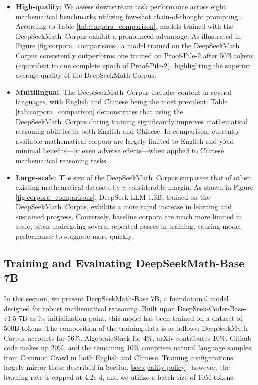 \begin{itemize}[topsep=0pt]
    \item \textbf{High-quality}:
    We assess downstream task performance across eight mathematical benchmarks utilizing few-shot chain-of-thought prompting \cite{cot}. According to Table \ref{tab:corpora_comparison}, models trained with the DeepSeekMath~Corpus exhibit a pronounced advantage. As illustrated in Figure \ref{fig:corpora_comparisons}, a model trained on the DeepSeekMath Corpus consistently outperforms one trained on Proof-Pile-2 after 50B tokens (equivalent to one complete epoch of Proof-Pile-2), highlighting the superior average quality of the DeepSeekMath Corpus.
    \item \textbf{Multilingual}:
    The DeepSeekMath~Corpus includes content in several languages, with English and Chinese being the most prevalent. Table \ref{tab:corpora_comparison} demonstrates that using the DeepSeekMath~Corpus during training significantly improves mathematical reasoning abilities in both English and Chinese. In comparison, currently available mathematical corpora are largely limited to English and yield minimal benefits—or even adverse effects—when applied to Chinese mathematical reasoning tasks.
    \item \textbf{Large-scale}:
    The size of the DeepSeekMath~Corpus surpasses that of other existing mathematical datasets by a considerable margin. As shown in Figure \ref{fig:corpora_comparisons}, DeepSeek-LLM 1.3B, trained on the DeepSeekMath~Corpus, exhibits a more rapid increase in learning and sustained progress. Conversely, baseline corpora are much more limited in scale, often undergoing several repeated passes in training, causing model performance to stagnate more quickly.
\end{itemize}

\subsection{Training and Evaluating DeepSeekMath-Base 7B}

In this section, we present DeepSeekMath-Base 7B, a foundational model designed for robust mathematical reasoning. Built upon DeepSeek-Coder-Base-v1.5 7B \citep{deepseek-coder} as its initialization point, this model has been trained on a dataset of 500B tokens. The composition of the training data is as follows: DeepSeekMath Corpus accounts for 56\%, AlgebraicStack for 4\%, arXiv contributes 10\%, Github code makes up 20\%, and the remaining 10\% comprises natural language samples from Common Crawl in both English and Chinese. Training configurations largely mirror those described in Section \ref{sec:quality-policy}; however, the learning rate is capped at 4.2e-4, and we utilize a batch size of 10M tokens.

